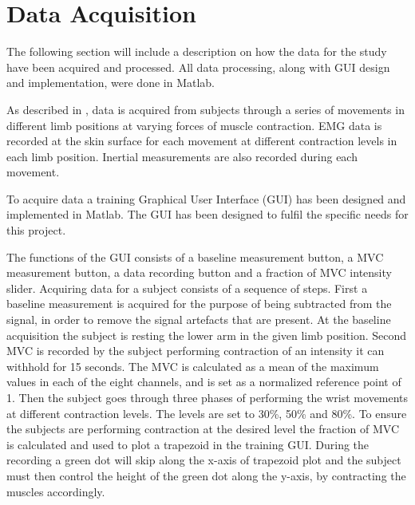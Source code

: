 \section{Data Acquisition}

The following section will include a description on how the data for the study have been acquired and processed. All data processing, along with GUI design and implementation, were done in Matlab.

As described in , data is acquired from subjects through a series of movements in different limb positions at varying forces of muscle contraction. EMG data is recorded at the skin surface for each movement at different contraction levels in each limb position. Inertial measurements are also recorded during each movement. 

To acquire data a training Graphical User Interface (GUI) has been designed and implemented in Matlab. The GUI has been designed to fulfil the specific needs for this project. 

The functions of the GUI consists of a baseline measurement button, a MVC measurement button, a data recording button and a fraction of MVC intensity slider. Acquiring data for a subject consists of a sequence of steps. First a baseline measurement is acquired for the purpose of being subtracted from the signal, in order to remove the signal artefacts that are present. At the baseline acquisition the subject is resting the lower arm in the given limb position. 
Second MVC is recorded by the subject performing contraction of an intensity it can withhold for 15 seconds. The MVC is calculated as a mean of the maximum values in each of the eight channels, and is set as a normalized reference point of 1.
Then the subject goes through three phases of performing the wrist movements at different contraction levels. The levels are set to 30\%, 50\% and 80\%. To ensure the subjects are performing contraction at the desired level the fraction of MVC is calculated and used to plot a trapezoid in the training GUI. During the recording a green dot will skip along the x-axis of trapezoid plot and the subject must then control the height of the green dot along the y-axis, by contracting the muscles accordingly. %


